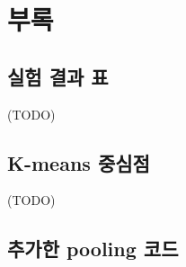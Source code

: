\documentclass[a4paper,9pt]{article}
\begin{document}
\pagebreak

\section*{부록}

\subsection*{실험 결과 표}

(TODO)

\subsection*{K-means 중심점}

(TODO)

\subsection*{추가한 pooling 코드}
\end{document}
